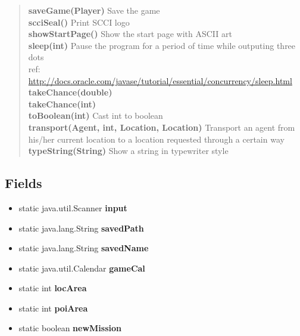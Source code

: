 {{{{{\begin{verse}
{\bf saveGame(Player)} Save the game\\
{\bf scciSeal()} Print SCCI logo\\
{\bf showStartPage()} Show the start page with ASCII art\\
{\bf sleep(int)} Pause the program for a period of time while outputing three dots\\ref: \url{http://docs.oracle.com/javase/tutorial/essential/concurrency/sleep.html}\\
{\bf takeChance(double)} \\
{\bf takeChance(int)} \\
{\bf toBoolean(int)} Cast int to boolean\\
{\bf transport(Agent, int, Location, Location)} Transport an agent from his/her current location to a location requested through a certain way\\
{\bf typeString(String)} Show a string in typewriter style\\
\end{verse}
}
\subsection{Fields}{
\begin{itemize}
\item{
\label{personOfInterest.Game.input}static java.util.Scanner {\bf  input}
}
\item{
\label{personOfInterest.Game.savedPath}static java.lang.String {\bf  savedPath}
}
\item{
\label{personOfInterest.Game.savedName}static java.lang.String {\bf  savedName}
}
\item{
\label{personOfInterest.Game.gameCal}static java.util.Calendar {\bf  gameCal}
}
\item{
\label{personOfInterest.Game.locArea}static int {\bf  locArea}}
\item{
\label{personOfInterest.Game.poiArea}static int {\bf  poiArea}}
\item{
\label{personOfInterest.Game.newMission}static boolean {\bf  newMission}
}
\end{itemize}
}
}}}}
